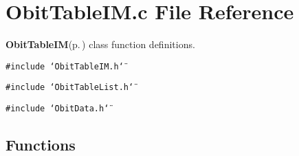 \section{Obit\-Table\-IM.c File Reference}
\label{ObitTableIM_8c}
{\bf Obit\-Table\-IM}{\rm (p.\,\pageref{structObitTableIM})} class function definitions. 

{\tt \#include \char`\"{}Obit\-Table\-IM.h\char`\"{}}\par
{\tt \#include \char`\"{}Obit\-Table\-List.h\char`\"{}}\par
{\tt \#include \char`\"{}Obit\-Data.h\char`\"{}}\par
\subsection*{Functions}
